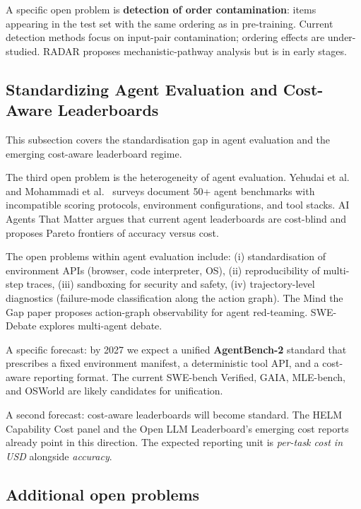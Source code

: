 \documentclass{article}
\begin{document}
A specific open problem is \textbf{detection of order contamination}: items appearing in the test set with the same ordering as in pre-training. Current detection methods focus on input-pair contamination; ordering effects are under-studied. RADAR \cite{kattamuri20252025} proposes mechanistic-pathway analysis but is in early stages.

\subsection{Standardizing Agent Evaluation and Cost-Aware Leaderboards}\label{standardizing-agent-evaluation-and-cost-aware-leaderboards}

This subsection covers the standardisation gap in agent evaluation and the emerging cost-aware leaderboard regime.

The third open problem is the heterogeneity of agent evaluation. Yehudai et al.~\cite{yehudai20252025} and Mohammadi et al.~\cite{mohammadi20252025} surveys document 50+ agent benchmarks with incompatible scoring protocols, environment configurations, and tool stacks. AI Agents That Matter \cite{kapoor20242024} argues that current agent leaderboards are cost-blind and proposes Pareto frontiers of accuracy versus cost.

The open problems within agent evaluation include: (i) standardisation of environment APIs (browser, code interpreter, OS), (ii) reproducibility of multi-step traces, (iii) sandboxing for security and safety, (iv) trajectory-level diagnostics (failure-mode classification along the action graph). The Mind the Gap paper \cite{wicaksono20252025} proposes action-graph observability for agent red-teaming. SWE-Debate \cite{li20252025} explores multi-agent debate.

A specific forecast: by 2027 we expect a unified \textbf{AgentBench-2} standard that prescribes a fixed environment manifest, a deterministic tool API, and a cost-aware reporting format. The current SWE-bench Verified, GAIA, MLE-bench, and OSWorld are likely candidates for unification.

A second forecast: cost-aware leaderboards will become standard. The HELM Capability Cost panel and the Open LLM Leaderboard's emerging cost reports already point in this direction. The expected reporting unit is \emph{per-task cost in USD} alongside \emph{accuracy}.

\subsection{Additional open problems}\label{additional-open-problems}
\end{document}
